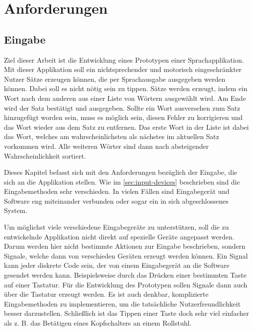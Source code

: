 \section{Anforderungen}
	\label{sec:requirements}
    
	\subsection{Eingabe}
 
    	Ziel dieser Arbeit ist die Entwicklung eines Prototypen einer Sprachapplikation. Mit dieser Applikation soll ein nichtsprechender und motorisch eingeschränkter Nutzer Sätze erzeugen können, die per Sprachausgabe ausgegeben werden können. Dabei soll es nicht nötig sein zu tippen. Sätze werden erzeugt, indem ein Wort nach dem anderen aus einer Liste von Wörtern ausgewählt wird. Am Ende wird der Satz bestätigt und ausgegeben. Sollte ein Wort ausversehen zum Satz hinzugefügt worden sein, muss es möglich sein, diesen Fehler zu korrigieren und das Wort wieder aus dem Satz zu entfernen. Das erste Wort in der Liste ist dabei das Wort, welches am wahrscheinlichsten als nächstes im aktuellen Satz vorkommen wird. Alle weiteren Wörter sind dann nach absteigender Wahrscheinlichkeit sortiert.
         
    	Dieses Kapitel befasst sich mit den Anforderungen bezüglich der Eingabe, die sich an die Applikation stellen. Wie im \autoref{sec:input-devices} beschrieben sind die Eingabemethoden sehr verschieden. In vielen Fällen sind Eingabegerät und Software eng miteinander verbunden oder sogar ein in sich abgeschlossenes System.
        
        Um möglichst viele verschiedene Eingabegeräte zu unterstützen, soll die zu entwickelnde Applikation nicht direkt auf spezielle Geräte angepasst werden. Darum werden hier nicht bestimmte Aktionen zur Eingabe beschrieben, sondern Signale, welche dann von verschieden Geräten erzeugt werden können. Ein Signal kann jeder diskrete Code sein, der von einem Eingabegerät an die Software gesendet werden kann. Beispielsweise durch das Drücken einer bestimmten Taste auf einer Tastatur. Für die Entwicklung des Prototypen sollen Signale dann auch über die Tastatur erzeugt werden. Es ist auch denkbar, komplizierte Eingabemethoden zu implementieren, um die tatsächliche Nutzerfreundlichkeit besser darzustellen. Schließlich ist das Tippen einer Taste doch sehr viel einfacher als z. B. das Betätigen eines Kopfschalters an einem Rollstuhl. 
        
